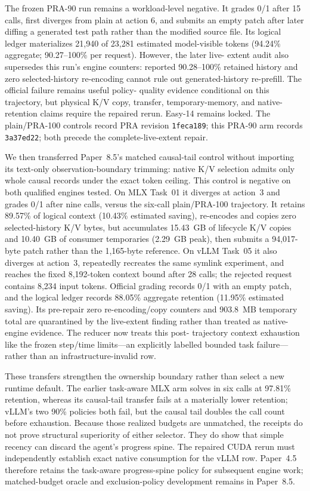 \documentclass[11pt]{article}
\begin{document}
The frozen PRA-90 run remains a workload-level negative.  It grades 0/1 after
15 calls, first diverges from plain at action 6, and submits an empty patch
after later diffing a generated test path rather than the modified source
file.  Its logical ledger materializes 21,940 of 23,281 estimated model-visible
tokens (94.24\% aggregate; 90.27--100\% per request).  However, the later live-
extent audit also supersedes this run's engine counters: reported 90.28--100\%
retained history and zero selected-history re-encoding cannot rule out
generated-history re-prefill.  The official failure remains useful policy-
quality evidence conditional on this trajectory, but physical K/V copy,
transfer, temporary-memory, and native-retention claims require the repaired
rerun.  Easy-14 remains locked.  The plain/PRA-100 controls record PRA revision
\texttt{1feca189}; this PRA-90 arm records \texttt{3a37ed22}; both precede the
complete-live-extent repair.

We then transferred Paper~8.5's matched causal-tail control without importing
its text-only observation-boundary trimming: native K/V selection admits only
whole causal records under the exact token ceiling.  This control is negative
on both qualified engines tested.  On MLX Task~01 it diverges at action~3 and
grades 0/1 after nine calls, versus the six-call plain/PRA-100 trajectory.  It
retains 89.57\% of logical context (10.43\% estimated saving), re-encodes and
copies zero selected-history K/V bytes, but accumulates 15.43~GB of lifecycle
K/V copies and 10.40~GB of consumer temporaries (2.29~GB peak), then submits a
94,017-byte patch rather than the 1,165-byte reference.  On vLLM Task~05 it
also diverges at action~3, repeatedly recreates the same symlink experiment,
and reaches the fixed 8,192-token context bound after 28 calls; the rejected
request contains 8,234 input tokens.  Official grading records 0/1 with an
empty patch, and the logical ledger records 88.05\% aggregate retention
(11.95\% estimated saving).  Its pre-repair zero re-encoding/copy counters and
903.8~MB temporary total are quarantined by the live-extent finding rather than
treated as native-engine evidence.  The reducer now treats this post-
trajectory context exhaustion like the frozen
step/time limits---an explicitly labelled bounded task failure---rather than an
infrastructure-invalid row.

These transfers strengthen the ownership boundary rather than select a new
runtime default.  The earlier task-aware MLX arm solves in six calls at 97.81\%
retention, whereas its causal-tail transfer fails at a materially lower
retention; vLLM's two 90\% policies both fail, but the causal tail doubles the
call count before exhaustion.  Because those realized budgets are unmatched,
the receipts do not prove structural superiority of either selector.  They do
show that simple recency can discard the agent's progress spine.  The repaired
CUDA rerun must independently establish exact native consumption for the vLLM
row.  Paper~4.5 therefore retains
the task-aware progress-spine policy for subsequent engine work; matched-budget
oracle and exclusion-policy development remains in Paper~8.5.
\end{document}
